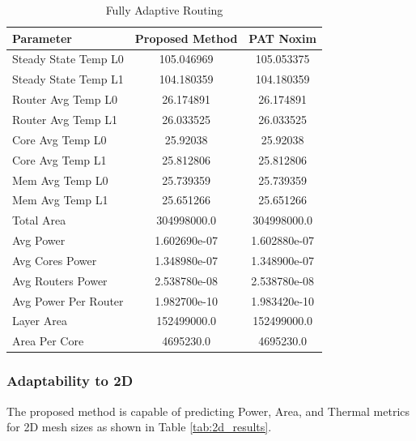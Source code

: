 \documentclass[conference]{IEEEtran}
\begin{document}
	\begin{table}[t]
		\centering
		\begin{tabular}{|l|c|c|}
			\hline
			\textbf{Parameter} & \textbf{Proposed Method} & \textbf{PAT Noxim} \\ \hline
			Steady State Temp L0 & 105.046969 & 105.053375 \\ \hline
			Steady State Temp L1 & 104.180359 & 104.180359 \\ \hline
			Router Avg Temp L0 & 26.174891 & 26.174891 \\ \hline
			Router Avg Temp L1 & 26.033525 & 26.033525 \\ \hline
			Core Avg Temp L0 & 25.92038 & 25.92038 \\ \hline
			Core Avg Temp L1 & 25.812806 & 25.812806 \\ \hline
			Mem Avg Temp L0 & 25.739359 & 25.739359 \\ \hline
			Mem Avg Temp L1 & 25.651266 & 25.651266 \\ \hline
			Total Area & 304998000.0 & 304998000.0 \\ \hline
			Avg Power & 1.602690e-07 & 1.602880e-07 \\ \hline
			Avg Cores Power & 1.348980e-07 & 1.348900e-07 \\ \hline
			Avg Routers Power & 2.538780e-08 & 2.538780e-08 \\ \hline
			Avg Power Per Router & 1.982700e-10 & 1.983420e-10 \\ \hline
			Layer Area & 152499000.0 & 152499000.0 \\ \hline
			Area Per Core & 4695230.0 & 4695230.0 \\ \hline
		\end{tabular}
		\caption{Fully Adaptive Routing}
		\label{table:fully_adaptive_routing}
	\end{table}
	
	\subsubsection{Adaptability to 2D}
	The proposed method is capable of predicting Power, Area, and Thermal metrics for 2D mesh sizes as shown in Table \ref{tab:2d_results}.
	
\end{document}
